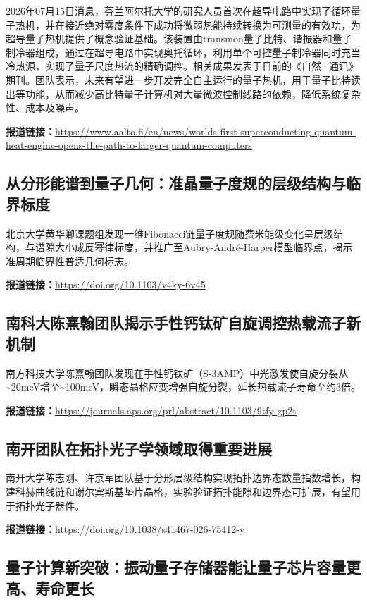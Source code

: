 \documentclass[12pt,a4paper]{ctexart}
\begin{document}
2026年07月15日消息，芬兰阿尔托大学的研究人员首次在超导电路中实现了循环量子热机，并在接近绝对零度条件下成功将微弱热能持续转换为可测量的有效功，为超导量子热机提供了概念验证基础。该装置由transmon量子比特、谐振器和量子制冷器组成，通过在超导电路中实现奥托循环，利用单个可控量子制冷器同时充当冷热源，实现了量子尺度热流的精确调控。相关成果发表于日前的《自然·通讯》期刊。团队表示，未来有望进一步开发完全自主运行的量子热机，用于量子比特读出等功能，从而减少高比特量子计算机对大量微波控制线路的依赖，降低系统复杂性、成本及噪声。

\noindent\textbf{报道链接：}\url{https://www.aalto.fi/en/news/worlds-first-superconducting-quantum-heat-engine-opens-the-path-to-larger-quantum-computers}

\subsection{ 从分形能谱到量子几何：准晶量子度规的层级结构与临界标度 }

北京大学黄华卿课题组发现一维Fibonacci链量子度规随费米能级变化呈层级结构，与谱隙大小成反幂律标度，并推广至Aubry-André-Harper模型临界点，揭示准周期临界性普适几何标志。

\noindent\textbf{报道链接：}\url{https://doi.org/10.1103/v4ky-6v45}

\subsection{ 南科大陈熹翰团队揭示手性钙钛矿自旋调控热载流子新机制 }

南方科技大学陈熹翰团队发现在手性钙钛矿（S-3AMP）中光激发使自旋分裂从\textasciitilde{}20meV增至\textasciitilde{}100meV，瞬态晶格应变增强自旋分裂，延长热载流子寿命至约3倍。

\noindent\textbf{报道链接：}\url{https://journals.aps.org/prl/abstract/10.1103/9tfy-gp2t}

\subsection{ 南开团队在拓扑光子学领域取得重要进展 }

南开大学陈志刚、许京军团队基于分形层级结构实现拓扑边界态数量指数增长，构建科赫曲线链和谢尔宾斯基垫片晶格，实验验证拓扑能隙和边界态可扩展，有望用于拓扑光子器件。

\noindent\textbf{报道链接：}\url{https://doi.org/10.1038/s41467-026-75412-y}

\subsection{ 量子计算新突破：振动量子存储器能让量子芯片容量更高、寿命更长 }
\end{document}
